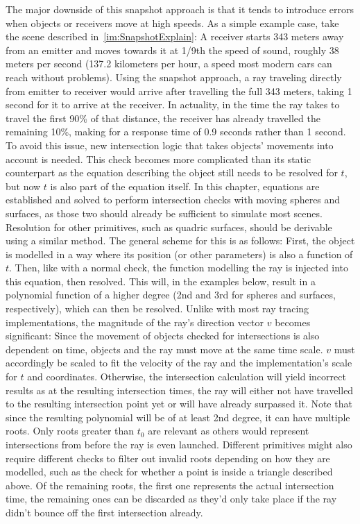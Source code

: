 The major downside of this snapshot approach is that it tends to introduce errors when objects or receivers move at high speeds.
As a simple example case, take the scene described in~\ref{im:SnapshotExplain}:
A receiver starts 343 meters away from an emitter and moves towards it at 1/9th the speed of sound, roughly 38 meters per second
(137.2 kilometers per hour, a speed most modern cars can reach without problems).
\newline
Using the snapshot approach, a ray traveling directly from emitter to receiver would arrive after travelling the full 343 meters,
taking 1 second for it to arrive at the receiver.
In actuality, in the time the ray takes to travel the first 90\% of that distance,
the receiver has already travelled the remaining 10\%, making for a response time of 0.9 seconds rather than 1 second.
\newline
To avoid this issue, new intersection logic that takes objects' movements into account is needed.
This check becomes more complicated than its static counterpart as the equation describing the object still needs to be resolved for \(t\),
but now \(t\) is also part of the equation itself.
In this chapter, equations are established and solved to perform intersection checks with moving spheres and surfaces,
as those two should already be sufficient to simulate most scenes.
Resolution for other primitives, such as quadric surfaces, should be derivable using a similar method.
\newline
The general scheme for this is as follows:
First, the object is modelled in a way where its position (or other parameters) is also a function of \(t\).
Then, like with a normal check, the function modelling the ray is injected into this equation,
then resolved.
This will, in the examples below, result in a polynomial function of a higher degree
(2nd and 3rd for spheres and surfaces, respectively), which can then be resolved.
\newline
Unlike with most ray tracing implementations, the magnitude of the ray's direction vector \(v\) becomes significant:
Since the movement of objects checked for intersections is also dependent on time,
objects and the ray must move at the same time scale.
\(v\) must accordingly be scaled to fit the velocity of the ray and the implementation's scale for \(t\) and coordinates.
Otherwise, the intersection calculation will yield incorrect results as at the resulting intersection times,
the ray will either not have travelled to the resulting intersection point yet or will have already surpassed it.
\newline
Note that since the resulting polynomial will be of at least 2nd degree, it can have multiple roots.
Only roots greater than \(t_0\) are relevant as others would represent intersections from before the ray is even launched.
Different primitives might also require different checks to filter out invalid roots depending on how they are modelled,
such as the check for whether a point is inside a triangle described above.
Of the remaining roots, the first one represents the actual intersection time,
the remaining ones can be discarded as they'd only take place if the ray didn't bounce off the first intersection already.

